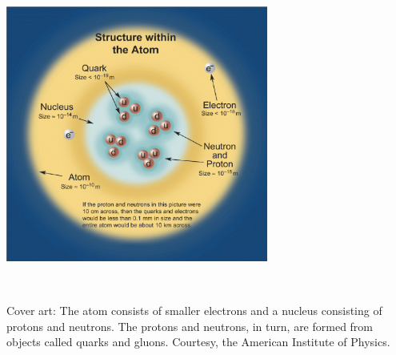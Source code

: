 \documentclass[twoside]{article}
\newcounter{activity}
\begin{document}
\begin{center}

\includegraphics[width=3.4in]{AtomicStructure.ps}

\end{center}

\thispagestyle{empty}

\newpage


\ 
\setcounter{page}{1}

\vfill

Cover art: The atom consists of smaller electrons and a nucleus consisting of protons and neutrons.
The protons and neutrons, in turn, are formed from objects called quarks and gluons.
Courtesy, the American Institute of Physics.

\pagebreak

\tableofcontents{}

\newpage

\setcounter{page}{3}

\thispagestyle{plain}

\vfill

\ 

\pagebreak

\setcounter{activity}{0}


%

\setcounter{activity}{0}


\setcounter{activity}{0}


\setcounter{activity}{0}


\setcounter{activity}{0}












\end{document}
